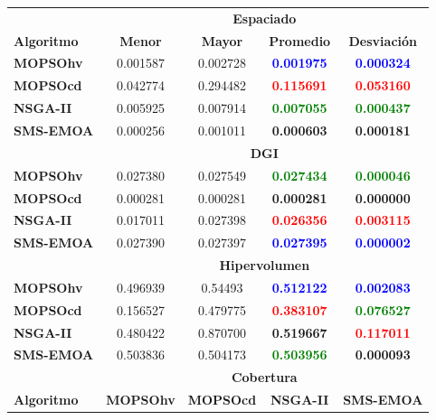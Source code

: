  \begin{table}
 \begin{center}
  \begin{tabular}{|l|cc|cc|} \hline
    & \multicolumn{4}{|c|}{\textbf{Espaciado}} \\ 
	\textbf{Algoritmo} & \textbf{Menor} & \textbf{Mayor} & \textbf{Promedio} & \textbf{Desviaci\'on} \\  \hline\hline
	\textbf{MOPSOhv} &0.001587 & 0.002728 & \textbf{\textcolor{blue}{ 0.001975}} & \textbf{\textcolor{blue}{0.000324}}  \\ 
	\textbf{MOPSOcd} &0.042774 & 0.294482 & \textbf{\textcolor{red}{0.115691}} & \textbf{\textcolor{red}{0.053160}} \\ 
	\textbf{NSGA-II} &0.005925 & 0.007914 & \textbf{\textcolor{green}{0.007055}} & \textbf{\textcolor{green}{0.000437 }} \\  
	\textbf{SMS-EMOA}&0.000256 & 0.001011 & \textbf{0.000603} & \textbf{0.000181} \\  
	\hline\hline
    & \multicolumn{4}{|c|}{\textbf{DGI}} \\ 	\hline \hline
	\textbf{MOPSOhv} &0.027380 & 0.027549 & \textbf{\textcolor{green}{0.027434}} & \textbf{\textcolor{green}{0.000046}}  \\ 
	\textbf{MOPSOcd} &0.000281 & 0.000281 & \textbf{0.000281} & \textbf{0.000000}  \\ 
	\textbf{NSGA-II} &0.017011 & 0.027398 & \textbf{\textcolor{red}{0.026356}} & \textbf{\textcolor{red}{0.003115}}  \\  
	\textbf{SMS-EMOA}&0.027390 & 0.027397 & \textbf{\textcolor{blue}{0.027395}} & \textbf{\textcolor{blue}{0.000002}}  \\  
	\hline\hline
    & \multicolumn{4}{|c|}{\textbf{Hipervolumen}} \\ \hline \hline
	\textbf{MOPSOhv} &0.496939 & 0.54493 & \textbf{\textcolor{blue}{0.512122}} & \textbf{\textcolor{blue}{0.002083}}  \\ 
	\textbf{MOPSOcd} &0.156527 & 0.479775 & \textbf{\textcolor{red}{0.383107}} & \textbf{\textcolor{green}{0.076527}} \\ 
	\textbf{NSGA-II} &0.480422 & 0.870700 & \textbf{0.519667} & \textbf{\textcolor{red}{0.117011}} \\  
	\textbf{SMS-EMOA}&0.503836 & 0.504173 & \textbf{\textcolor{green}{0.503956}} & \textbf{0.000093} \\  
	\hline\hline
    & \multicolumn{4}{|c|}{\textbf{Cobertura}} \\ \hline\hline 
	\textbf{Algoritmo} & \textbf{MOPSOhv} & \textbf{MOPSOcd} & \textbf{NSGA-II} & \textbf{SMS-EMOA} \\  \hline \hline

\end{tabular}
\end{center}
\end{table}
